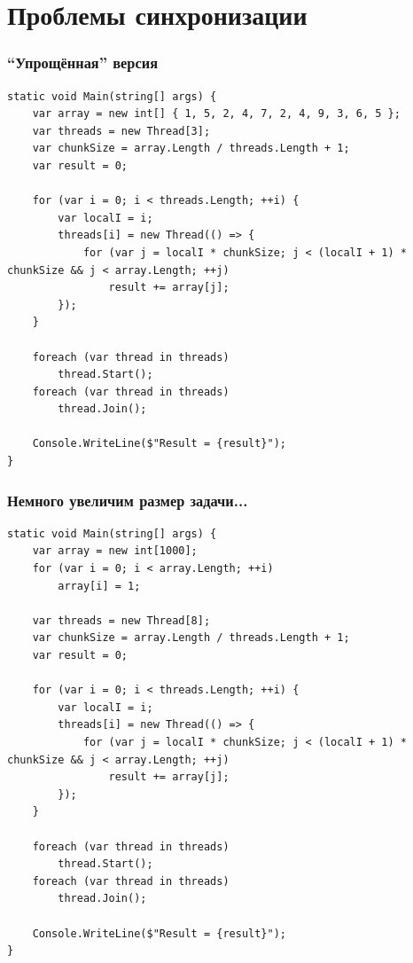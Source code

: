 \documentclass[xetex,mathserif,serif]{beamer}
\begin{document}
    \section{Проблемы синхронизации}

    \begin{frame}[fragile]
        \frametitle{``Упрощённая'' версия}
        \begin{ssmall}
            \begin{verbatim}
static void Main(string[] args) {
    var array = new int[] { 1, 5, 2, 4, 7, 2, 4, 9, 3, 6, 5 };
    var threads = new Thread[3];
    var chunkSize = array.Length / threads.Length + 1;
    var result = 0;

    for (var i = 0; i < threads.Length; ++i) {
        var localI = i;
        threads[i] = new Thread(() => {
            for (var j = localI * chunkSize; j < (localI + 1) * chunkSize && j < array.Length; ++j)
                result += array[j];
        });
    }

    foreach (var thread in threads)
        thread.Start();
    foreach (var thread in threads)
        thread.Join();

    Console.WriteLine($"Result = {result}");
}
            \end{verbatim}
        \end{ssmall}
    \end{frame}

    \begin{frame}[fragile]
        \frametitle{Немного увеличим размер задачи...}
        \begin{ssmall}
            \begin{verbatim}
static void Main(string[] args) {
    var array = new int[1000];
    for (var i = 0; i < array.Length; ++i)
        array[i] = 1;

    var threads = new Thread[8];
    var chunkSize = array.Length / threads.Length + 1;
    var result = 0;

    for (var i = 0; i < threads.Length; ++i) {
        var localI = i;
        threads[i] = new Thread(() => {
            for (var j = localI * chunkSize; j < (localI + 1) * chunkSize && j < array.Length; ++j)
                result += array[j];
        });
    }

    foreach (var thread in threads)
        thread.Start();
    foreach (var thread in threads)
        thread.Join();

    Console.WriteLine($"Result = {result}");
}
            \end{verbatim}
        \end{ssmall}
    \end{frame}
\end{document}
